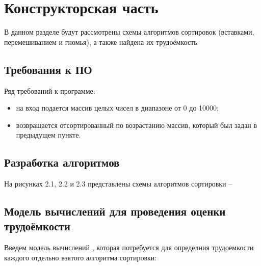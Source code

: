 \chapter{Конструкторская часть}
В данном разделе будут рассмотрены схемы алгоритмов сортировок (вставками, перемешиванием и гномья), а также найдена их трудоёмкость

\section{Требования к ПО}
Ряд требований к программе:
\begin{itemize}
	\item на вход подается массив целых чисел в диапазоне от 0 до 10000;
    \item возвращается отсортированный по возрастанию массив, который был задан в предыдущем пункте. \newline
\end{itemize}

\section{Разработка алгоритмов}
На рисунках 2.1, 2.2 и 2.3 представлены схемы алгоритмов сортировки --

\clearpage

\section{Модель вычислений для проведения оценки трудоёмкости}
Введем модель вычислений \cite{model}, которая потребуется для определния трудоемкости каждого отдельно взятого алгоритма сортировки:

